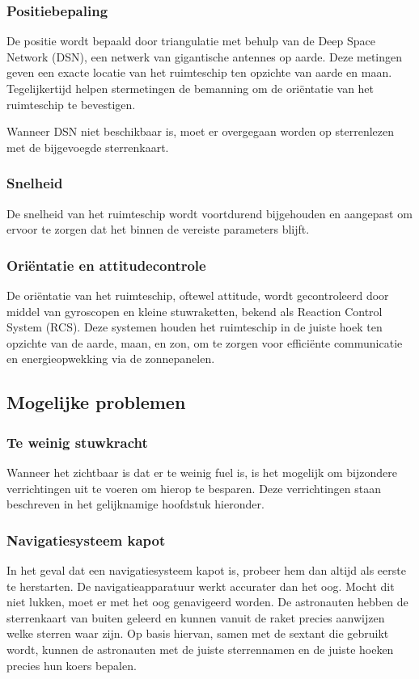 \subsubsection{Positiebepaling}
De positie wordt bepaald door triangulatie met behulp van de Deep Space Network (DSN), een netwerk van gigantische antennes op aarde. Deze metingen geven een exacte locatie van het ruimteschip ten opzichte van aarde en maan. Tegelijkertijd helpen stermetingen de bemanning om de oriëntatie van het ruimteschip te bevestigen.

Wanneer DSN niet beschikbaar is, moet er overgegaan worden op sterrenlezen met de bijgevoegde sterrenkaart.

\subsubsection{Snelheid}
De snelheid van het ruimteschip wordt voortdurend bijgehouden en aangepast om ervoor te zorgen dat het binnen de vereiste parameters blijft.

\subsubsection{Oriëntatie en attitudecontrole}
De oriëntatie van het ruimteschip, oftewel attitude, wordt gecontroleerd door middel van gyroscopen en kleine stuwraketten, bekend als Reaction Control System (RCS). Deze systemen houden het ruimteschip in de juiste hoek ten opzichte van de aarde, maan, en zon, om te zorgen voor efficiënte communicatie en energieopwekking via de zonnepanelen.


\subsection{Mogelijke problemen}

\subsubsection{Te weinig stuwkracht}
Wanneer het zichtbaar is dat er te weinig fuel is, is het mogelijk om bijzondere verrichtingen uit te voeren om hierop te besparen. Deze verrichtingen staan beschreven in het gelijknamige hoofdstuk hieronder.

\subsubsection{Navigatiesysteem kapot}
In het geval dat een navigatiesysteem kapot is, probeer hem dan altijd als eerste te herstarten. De navigatieapparatuur werkt accurater dan het oog. Mocht dit niet lukken, moet er met het oog genavigeerd worden. De astronauten hebben de sterrenkaart van buiten geleerd en kunnen vanuit de raket precies aanwijzen welke sterren waar zijn. Op basis hiervan, samen met de sextant die gebruikt wordt, kunnen de astronauten met de juiste sterrennamen en de juiste hoeken precies hun koers bepalen.


